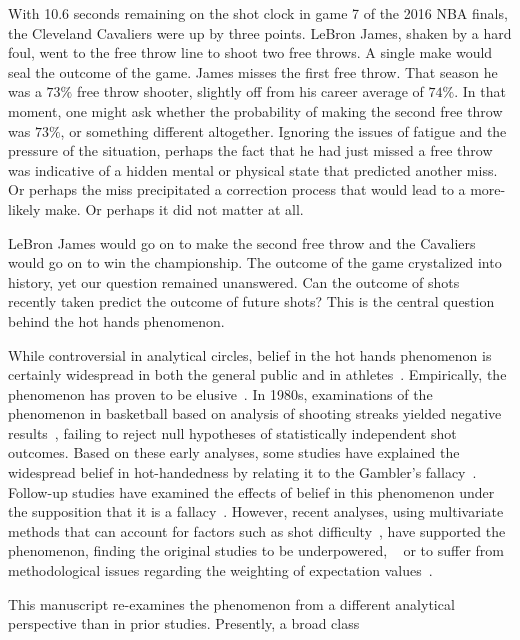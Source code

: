 \documentclass{IOS-Book-Article}
\begin{document}
With 10.6 seconds remaining on the shot clock in game 7 of the 2016 NBA finals, the Cleveland Cavaliers were up by three points. LeBron James, shaken by a hard foul, went to the free throw line to shoot two free throws. A single make would seal the outcome of the game. James misses the first free throw. That season he was a $73\%$ free throw shooter, slightly off from his career average of $74\%$. In that moment, one might ask whether the probability of making the second free throw was $73\%$, or something different altogether. Ignoring the issues of fatigue and the pressure of the situation, perhaps the fact that he had just missed a free throw was indicative of a hidden mental or physical state that predicted another miss. Or perhaps the miss precipitated a correction process that would lead to a more-likely make. Or perhaps it did not matter at all. 

LeBron James would go on to make the second free throw and the Cavaliers would go on to win the championship. The outcome of the game crystalized into history, yet our question remained unanswered. Can the outcome of shots recently taken predict the outcome of future shots? This is the central question behind the hot hands phenomenon. 

While controversial in analytical circles, belief in the hot hands phenomenon is certainly widespread in both the general public and in athletes~\cite{gilovich1985hot,camerer1989does,rao2009experts}.
Empirically, the phenomenon has proven to be elusive~\cite{bar2006twenty}. In 1980s, examinations of the phenomenon in basketball based on analysis of shooting streaks yielded negative results~\cite{gilovich1985hot,koehler2003hot}, failing to reject  null hypotheses
 of statistically independent shot outcomes.  Based on these early analyses, some studies have
explained the widespread belief in hot-handedness by relating it to the Gambler's fallacy~\cite{ayton2004hot}.
 Follow-up studies have examined the effects of belief in this phenomenon under the supposition that it is a fallacy~\cite{burns2001hot}. However, recent analyses, using multivariate methods that can account for factors such as shot difficulty~\cite{bocskocsky2014hot,arkes2010revisiting,miller2016surprised}, have supported the phenomenon, finding the original studies to be underpowered, ~\cite{arkes2010revisiting,arkes2013misses,miller2016surprised} or to suffer from methodological issues regarding the weighting of expectation values~\cite{miller2016surprised}.


This manuscript re-examines the phenomenon from a different analytical perspective than in prior studies. Presently, 
a broad class 
\end{document}
